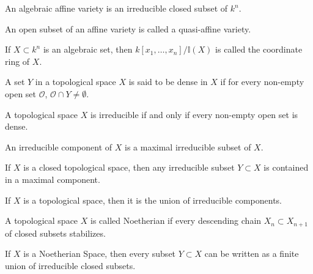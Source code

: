 \documentclass[crop=false,class=article,oneside]{standalone}
\begin{document}
            \begin{definition}
                An algebraic affine variety is an
                irreducible closed subset of $k^n$.
            \end{definition}
            \begin{definition}
                An open subset of an affine variety
                is called a quasi-affine variety.
            \end{definition}
            \begin{definition}
                If $X\subset k^n$ is an algebraic set,
                then $k[x_1,\hdots ,x_n]/\mathbb{I}(X)$
                is called the coordinate ring of $X$.
            \end{definition}
            \begin{definition}
                A set $Y$ in a topological space $X$ is
                said to be dense in $X$ if for every
                non-empty open set $\mathcal{O}$,
                $\mathcal{O}\cap Y\ne \emptyset$.
            \end{definition}
            \begin{theorem}
                A topological space $X$ is irreducible if
                and only if every non-empty open set is dense.
            \end{theorem}
            \begin{definition}
                An irreducible component of $X$ is a
                maximal irreducible subset of $X$.
            \end{definition}
            \begin{theorem}
                If $X$ is a closed topological space,
                then any irreducible subset $Y\subset X$ is
                contained in a maximal component.
            \end{theorem}
            \begin{theorem}
                If $X$ is a topological space,
                then it is the union of irreducible components.
            \end{theorem}
            \begin{definition}
                A topological space $X$ is called Noetherian
                if every descending chain $X_n \subset X_{n+1}$
                of closed subsets stabilizes.
            \end{definition}
            \begin{theorem}
                If $X$ is a Noetherian Space,
                then every subset $Y\subset X$ can be
                written as a finite union of irreducible
                closed subsets.
            \end{theorem}
\end{document}
